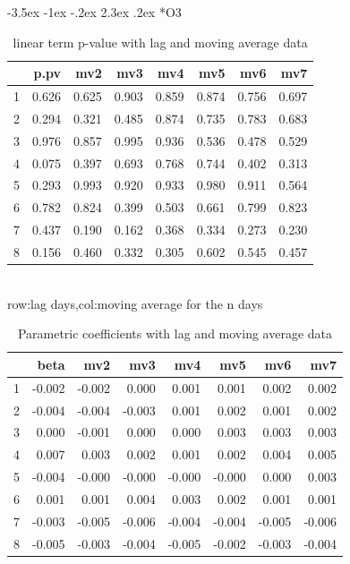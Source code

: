 \documentclass[a4paper, 12pt]{article}
\makeatletter
\def\large{\fontsize{14}{20}\selectfont}
\renewcommand\subsection{\@startsection {subsection}{1}{\z@}%
                                   {-3.5ex \@plus -1ex \@minus -.2ex}%
                                   {2.3ex \@plus.2ex}%
                                   {\centering\normalfont\large\bfseries}}
\makeatother
\begin{document}
\clearpage
\subsection*{O3}
\begin{table}[h]
\centering
\caption{linear term p-value with lag and moving average data}
\begin{tabular}{rrrrrrrr}
  \hline
 & p.pv & mv2 & mv3 & mv4 & mv5 & mv6 & mv7 \\
  \hline
1 & 0.626 & 0.625 & 0.903 & 0.859 & 0.874 & 0.756 & 0.697 \\
  2 & 0.294 & 0.321 & 0.485 & 0.874 & 0.735 & 0.783 & 0.683 \\
  3 & 0.976 & 0.857 & 0.995 & 0.936 & 0.536 & 0.478 & 0.529 \\
  4 & 0.075 & 0.397 & 0.693 & 0.768 & 0.744 & 0.402 & 0.313 \\
  5 & 0.293 & 0.993 & 0.920 & 0.933 & 0.980 & 0.911 & 0.564 \\
  6 & 0.782 & 0.824 & 0.399 & 0.503 & 0.661 & 0.799 & 0.823 \\
  7 & 0.437 & 0.190 & 0.162 & 0.368 & 0.334 & 0.273 & 0.230 \\
  8 & 0.156 & 0.460 & 0.332 & 0.305 & 0.602 & 0.545 & 0.457 \\
   \hline
\end{tabular}
\\row:lag days,col:moving average for the n days
\end{table}

\begin{table}[h]
\centering
\caption{Parametric coefficients with lag and moving average data}
\begin{tabular}{rrrrrrrr}
  \hline
 & beta & mv2 & mv3 & mv4 & mv5 & mv6 & mv7 \\
  \hline
1 & -0.002 & -0.002 & 0.000 & 0.001 & 0.001 & 0.002 & 0.002 \\
  2 & -0.004 & -0.004 & -0.003 & 0.001 & 0.002 & 0.001 & 0.002 \\
  3 & 0.000 & -0.001 & 0.000 & 0.000 & 0.003 & 0.003 & 0.003 \\
  4 & 0.007 & 0.003 & 0.002 & 0.001 & 0.002 & 0.004 & 0.005 \\
  5 & -0.004 & -0.000 & -0.000 & -0.000 & -0.000 & 0.000 & 0.003 \\
  6 & 0.001 & 0.001 & 0.004 & 0.003 & 0.002 & 0.001 & 0.001 \\
  7 & -0.003 & -0.005 & -0.006 & -0.004 & -0.004 & -0.005 & -0.006 \\
  8 & -0.005 & -0.003 & -0.004 & -0.005 & -0.002 & -0.003 & -0.004 \\
   \hline
\end{tabular}
\end{table}
\end{document}
